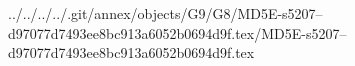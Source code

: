 ../../../../.git/annex/objects/G9/G8/MD5E-s5207--d97077d7493ee8bc913a6052b0694d9f.tex/MD5E-s5207--d97077d7493ee8bc913a6052b0694d9f.tex